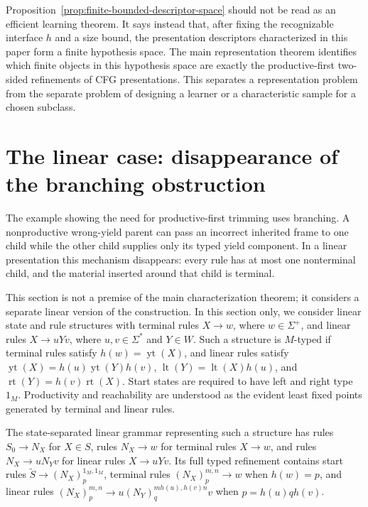 \documentclass[sub]{jalc}
\newcommand{\yt}{\operatorname{yt}}
\newcommand{\lt}{\operatorname{lt}}
\newcommand{\rt}{\operatorname{rt}}
\newcommand{\eM}{1_M}
\begin{document}
\begin{remark}
Proposition~\ref{prop:finite-bounded-descriptor-space} should not be read as
an efficient learning theorem.  It says instead that, after fixing the
recognizable interface \(h\) and a size bound, the presentation descriptors
characterized in this paper form a finite hypothesis space.  The main
representation theorem identifies which finite objects in this hypothesis space
are exactly the productive-first two-sided refinements of CFG presentations.
This separates a representation problem from the separate problem of designing
a learner or a characteristic sample for a chosen subclass.
\end{remark}

\section{The linear case: disappearance of the branching obstruction}
\label{sec:linear-case}

The example showing the need for productive-first trimming uses branching. A nonproductive wrong-yield parent can pass an incorrect inherited frame to one child while the other child supplies only its typed yield component. In a linear presentation this mechanism disappears: every rule has at most one nonterminal child, and the material inserted around that child is terminal.

This section is not a premise of the main characterization theorem; it considers a separate linear version of the construction. In this section only, we consider linear state and rule structures with terminal rules \(X\to w\), where \(w\in\Sigma^+\), and linear rules \(X\to uYv\), where \(u,v\in\Sigma^*\) and \(Y\in W\). Such a structure is \(M\)-typed if terminal rules satisfy \(h(w)=\yt(X)\), and linear rules satisfy \(\yt(X)=h(u)\yt(Y)h(v)\), \(\lt(Y)=\lt(X)h(u)\), and \(\rt(Y)=h(v)\rt(X)\). Start states are required to have left and right type \(\eM\). Productivity and reachability are understood as the evident least fixed points generated by terminal and linear rules.

The state-separated linear grammar representing such a structure has rules \(S_0\to N_X\) for \(X\in S\), rules \(N_X\to w\) for terminal rules \(X\to w\), and rules \(N_X\to uN_Yv\) for linear rules \(X\to uYv\). Its full typed refinement contains start rules \(\widetilde S\to (N_X)_p^{\eM,\eM}\), terminal rules \((N_X)_p^{m,n}\to w\) when \(h(w)=p\), and linear rules \((N_X)_p^{m,n}\to u(N_Y)_q^{m h(u),h(v)n}v\) when \(p=h(u)q h(v)\).
\end{document}
